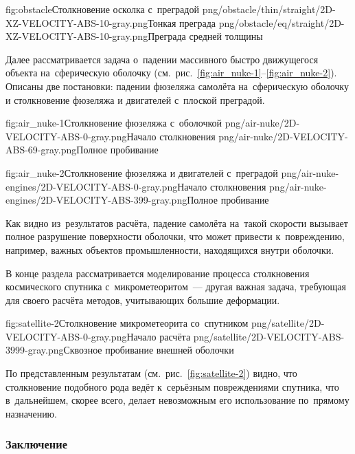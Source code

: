 \documentclass[a4paper,14pt]{extarticle}
\numberwithin{equation}{section}
\begin{document}
        \twofigs
            {fig:obstacle}{Столкновение осколка с~преградой}
            {png/obstacle/thin/straight/2D-XZ-VELOCITY-ABS-10-gray.png}{Тонкая преграда}
            {png/obstacle/eq/straight/2D-XZ-VELOCITY-ABS-10-gray.png}{Преграда средней толщины}


        Далее рассматривается задача о~падении массивного быстро движущегося объекта на~сферическую оболочку
        (см.~рис.~\ref{fig:air_nuke-1}--\ref{fig:air_nuke-2}). Описаны две постановки: падении фюзеляжа самолёта
        на~сферическую оболочку и столкновение фюзеляжа и двигателей с~плоской преградой.

        \twofigs
            {fig:air_nuke-1}{Столкновение фюзеляжа с~оболочкой}
            {png/air-nuke/2D-VELOCITY-ABS-0-gray.png}{Начало столкновения}
            {png/air-nuke/2D-VELOCITY-ABS-69-gray.png}{Полное пробивание}

        \twofigs
            {fig:air_nuke-2}{Столкновение фюзеляжа и двигателей с~преградой}
            {png/air-nuke-engines/2D-VELOCITY-ABS-0-gray.png}{Начало столкновения}
            {png/air-nuke-engines/2D-VELOCITY-ABS-399-gray.png}{Полное пробивание}

        Как видно из~результатов расчёта, падение самолёта на~такой скорости вызывает полное разрушение поверхности
        оболочки, что может привести к~повреждению, например, важных объектов промышленности, находящихся внутри
        оболочки.

        В конце раздела рассматривается моделирование процесса столкновения космического спутника с~микрометеоритом~---
        другая важная задача, требующая для своего расчёта методов, учитывающих большие деформации.

        \twofigs
            {fig:satellite-2}{Столкновение микрометеорита со~спутником}
            {png/satellite/2D-VELOCITY-ABS-0-gray.png}{Начало расчёта}
            {png/satellite/2D-VELOCITY-ABS-3999-gray.png}{Сквозное пробивание внешней оболочки}

        По представленным результатам (см.~рис.~\ref{fig:satellite-2}) видно, что столкновение подобного рода ведёт
        к~серьёзным повреждениями спутника, что в~дальнейшем, скорее всего, делает невозможным его использование
        по~прямому назначению.

        \subsubsection*{Заключение}
\end{document}
